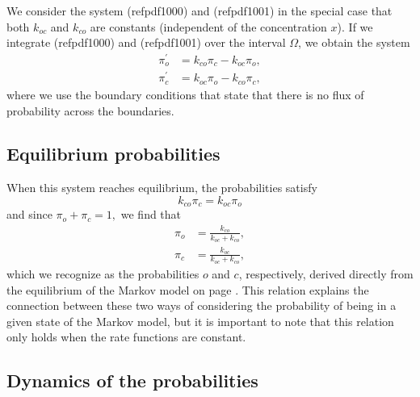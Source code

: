 We consider the system (ref{pdf1000}) and (ref{pdf1001}) in the
special case that both $k_{oc}$ and $k_{co}$ are constants (independent of the concentration $x$). If we integrate
(ref{pdf1000}) and (ref{pdf1001}) over the interval $\Omega$, we obtain the system
\begin{align}
\pi_{o}^{\prime}  &  =k_{co}\pi_{c}-k_{oc}\pi_{o},\label{pi1}\\
\pi_{c}^{\prime}  &  =k_{oc}\pi_{o}-k_{co}\pi_{c}, \label{pi2}
\end{align}
where we use the boundary conditions that state that there is no flux
of probability across the boundaries.

\subsection{Equilibrium probabilities}


When this system reaches equilibrium, the probabilities satisfy
\begin{equation}
k_{co}\pi_{c}=k_{oc}\pi_{o}
\end{equation}
and since $\pi_{o}+\pi_{c}=1,$ we find that
\begin{align}
\pi_{o} &  =\frac{k_{co}}{k_{oc}+k_{co}},\label{eq_po}\\
\pi_{c} &  =\frac{k_{oc}}{k_{oc}+k_{co}},\label{eq_pc}
\end{align}
which we recognize as the probabilities $o$ and $c$, respectively, derived directly from the
equilibrium of the Markov model on page \pageref{eq_pr_wt}. This relation explains
the connection between these two ways of considering the probability of
being in a given state of the Markov model, but it is important to note that
this relation only holds when the rate functions are constant.



\subsection{Dynamics of the probabilities}

